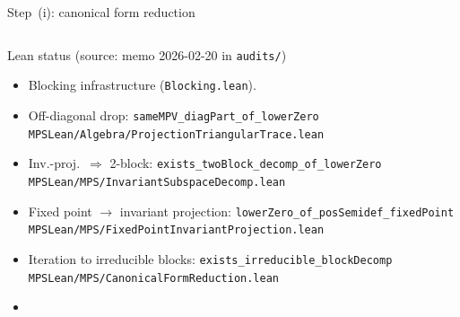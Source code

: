 \documentclass[aspectratio=169,10pt]{beamer}
\begin{document}
\begin{frame}{Step~(i): canonical form reduction~\cite{Cirac2017Annals,Cirac2021Matrix}}
\begin{columns}[T]
        \begin{block}{Lean status \textnormal{\scriptsize(source: memo 2026-02-20 in \texttt{audits/})}}
            \begin{itemize}\itemsep0.10em
                \item[\textcolor{leangreen}{\checkmark}]
                      Blocking infrastructure
                      (\texttt{Blocking.lean}).
                \item[\textcolor{leangreen}{\checkmark}]
                      Off-diagonal drop:
                      \texttt{sameMPV\_diagPart\_of\_lowerZero}\\
                      {\scriptsize\textcolor{dimwhite}{\texttt{MPSLean/Algebra/ProjectionTriangularTrace.lean}}}
                \item[\textcolor{leangreen}{\checkmark}]
                      Inv.-proj.\ $\Rightarrow$ 2-block:
                      \texttt{exists\_twoBlock\_decomp\_of\_lowerZero}\\
                      {\scriptsize\textcolor{dimwhite}{\texttt{MPSLean/MPS/InvariantSubspaceDecomp.lean}}}
                \item[\textcolor{leangreen}{\checkmark}]
                      Fixed point $\to$ invariant projection:
                      \texttt{lowerZero\_of\_posSemidef\_fixedPoint}\\
                      {\scriptsize\textcolor{dimwhite}{\texttt{MPSLean/MPS/FixedPointInvariantProjection.lean}}}
                \item[\textcolor{leangreen}{\checkmark}]
                      Iteration to irreducible blocks:
                      \texttt{exists\_irreducible\_blockDecomp}\\
                      {\scriptsize\textcolor{dimwhite}{\texttt{MPSLean/MPS/CanonicalFormReduction.lean}}}%
                      ~\cite{Cirac2017Annals,Cirac2017Irreducible}
                \item[\textcolor{leangreen}{\checkmark}]

\end{itemize}
\end{block}
\end{columns}
\end{frame}
\end{document}
